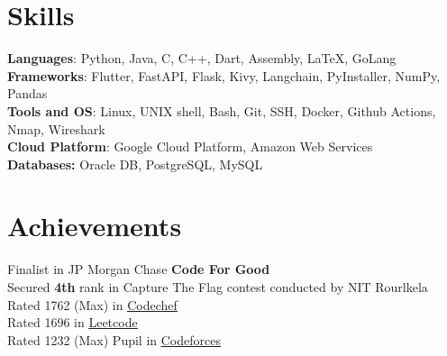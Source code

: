 
\resumeSubHeadingListEnd

%
\vspace{-10px}
\section{Skills}
\begin{itemize}[leftmargin=0.15in, label={}]
  \small{\item{
        \textbf{Languages}{: Python, Java, C, C++, Dart, Assembly, LaTeX, GoLang} \\
        \textbf{Frameworks}{: Flutter, FastAPI, Flask, Kivy, Langchain, PyInstaller, NumPy, Pandas} \\
        \textbf{Tools and OS}{: Linux, UNIX shell, Bash, Git, SSH, Docker, Github Actions, Nmap, Wireshark} \\
        \textbf{Cloud Platform}{: Google Cloud Platform, Amazon Web Services} \\
        \textbf{Databases: }{Oracle DB, PostgreSQL, MySQL} \\
        }}

\end{itemize}


%
\section{Achievements}
\begin{itemize}[leftmargin=0.15in, label={}]
  \small{\item{
        Finalist in JP Morgan Chase \textbf{Code For Good} \\
        Secured \textbf{4th} rank in Capture The Flag contest conducted by NIT Rourlkela \\
        Rated 1762 (Max) in \href{https://www.codechef.com/users/ashu2909}
        {\underline{Codechef}} \\
        {Rated 1696 in \href{https://leetcode.com/ashu_coderc/}{\underline{Leetcode}}} \\
        Rated 1232 (Max) Pupil in \href{https://codeforces.com/profile/ashucoder}
        {\underline{Codeforces}} \\
        }}


\end{itemize}
